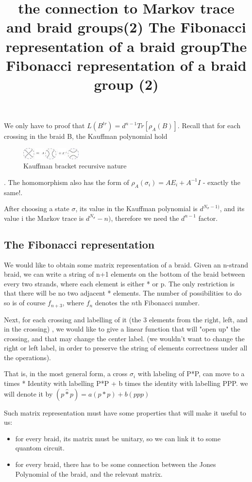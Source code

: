 \documentclass{article}
\begin{document}
We only have to proof that $L(B^{tr}) = d^{n-1}Tr[\rho_{A}(B)]$. Recall that for each crossing in the braid B, the Kauffman polynomial hold \begin{figure}
\includegraphics[scale=1]{Kauffman_bracket_identity} 
\caption{Kauffman bracket recursive nature}
\end{figure}.
The homomorphism also has the form of  $\rho_{A}(\sigma_{i}) = AE_{i} +A^{-1}I$ - exactly the same!.

\title{the connection to Markov trace and braid groups(2) }
After choosing a state $\sigma$, its value in the Kauffman polynomial is $d^{N_{\sigma} -1)}$, and its
value i the Markov trace is $d^{N_{\sigma}} -n )$, therefore we need the $d^{n-1}$ factor. 
 

\subsection{The Fibonacci representation}
\title{The Fibonacci representation of a braid group}
We would like to obtain some matrix representation of a braid. Given an n-strand braid, we can write a string of n+1 elements on the bottom of the braid between every two strands, where each element is either * or p. The only restriction is that there will be no two adjacent * elements. The number of possibilities to do so is of course $f_{n+3}$, where $f_{n}$ denotes the $n$th Fibonacci number.

Next, for each crossing and labelling of it (the 3 elements from the right, left, and in the crossing) , we would like to give a linear function that will "open up" the crossing, and that may change the center label. (we wouldn't want to change the right or left label, in order to preserve the string of elements correctness under all the operations).
 

\title{The Fibonacci representation of a braid group (2)}
That is, in the most general form, a cross $\sigma_{i}$ with labeling of P*P, can move to 
a times * Identity with labelling P*P + b times the identity with labelling PPP.
we will denote it by $(p\hat{*}p)=a(p*p)+b(ppp)$


Such matrix representation must have some properties that will make it useful to us:
\begin{itemize}
\item for every braid, its matrix must be unitary, so we can link it to some quantom circuit.
\item for every braid, there has to be some connection between the Jones Polynomial of the braid, and the relevant matrix.
\end{itemize}
 
\end{document}
